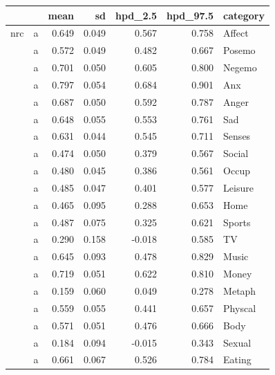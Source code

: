 \documentclass[11pt,a4paper]{article}
\begin{document}
\tiny
\clearpage
\onecolumn
\begin{longtable}{llrrrrl}

\toprule
   &    &   mean &     sd &  hpd\_2.5 &  hpd\_97.5 &        category \\
\midrule
nrc & a &  0.649 &  0.049 &    0.567 &     0.758 &          Affect \\
   & a &  0.572 &  0.049 &    0.482 &     0.667 &          Posemo \\
   & a &  0.701 &  0.050 &    0.605 &     0.800 &          Negemo \\
   & a &  0.797 &  0.054 &    0.684 &     0.901 &             Anx \\
   & a &  0.687 &  0.050 &    0.592 &     0.787 &           Anger \\
   & a &  0.648 &  0.055 &    0.553 &     0.761 &             Sad \\
   & a &  0.631 &  0.044 &    0.545 &     0.711 &          Senses \\
   & a &  0.474 &  0.050 &    0.379 &     0.567 &          Social \\
   & a &  0.480 &  0.045 &    0.386 &     0.561 &           Occup \\
   & a &  0.485 &  0.047 &    0.401 &     0.577 &         Leisure \\
   & a &  0.465 &  0.095 &    0.288 &     0.653 &            Home \\
   & a &  0.487 &  0.075 &    0.325 &     0.621 &          Sports \\
   & a &  0.290 &  0.158 &   -0.018 &     0.585 &              TV \\
   & a &  0.645 &  0.093 &    0.478 &     0.829 &           Music \\
   & a &  0.719 &  0.051 &    0.622 &     0.810 &           Money \\
   & a &  0.159 &  0.060 &    0.049 &     0.278 &          Metaph \\
   & a &  0.559 &  0.055 &    0.441 &     0.657 &         Physcal \\
   & a &  0.571 &  0.051 &    0.476 &     0.666 &            Body \\
   & a &  0.184 &  0.094 &   -0.015 &     0.343 &          Sexual \\
   & a &  0.661 &  0.067 &    0.526 &     0.784 &          Eating \\

\end{longtable}
\end{document}
